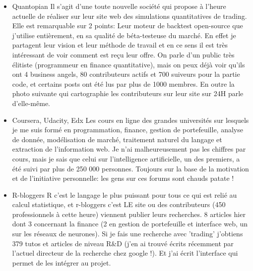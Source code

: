 \begin{itemize}

    \item Quantopian
  Il s'agit d'une toute nouvelle société qui propose à l'heure actuelle de
réaliser sur leur site web des simulations quantitatives de trading. Elle
est remarquable sur 2 points: Leur moteur de backtest open-source que
j'utilise entièrement,  en sa qualité de béta-testeuse du marché. En effet je partagent leur vision
et leur méthode de travail et en ce sens il est très intéressant de voir
comment est reçu leur offre. \newline
On parle d'un public très élitiste (programmeur en finance quantitative),
mais on peux déjà voir qu'ils ont 4 business angels, 80 contributeurs actifs et 700
suiveurs pour la partie code, et certains posts ont été lus par plus de 1000
membres. En outre la photo suivante qui cartographie les contributeurs sur
leur site sur 24H parle d'elle-même.\newline
\newline

  \item Coursera, Udacity, Edx
    Les cours en ligne des grandes universités sur lesquels je me suis
formé en programmation, finance, gestion de portefeuille, analyse de
donnée, modélisation de marché, traitement naturel du langage et
extraction de l'information web. Je n'ai malheureusement pas les
chiffres par cours, mais je sais que celui sur l'intelligence
artificielle, un des premiers, a été suivi par plus de 250 000
personnes. Toujours sur la base de la motivation et de l'initiative
personnelle: les gens sur ces forums sont chauds patate !\newline

  \item R-bloggers
    R c'est le langage le plus puissant pour tous ce qui est relié au
calcul statistique, et r-bloggers c'est LE site ou des contributeurs (450
professionnels à cette heure) viennent publier leurs recherches. 8 articles
hier dont 3 concernant la finance (2 en gestion de portefeuille et interface
web, un sur les réseaux de neurones). Si je fais une recherche avec 'trading'
j'obtiens 379 tutos et articles de niveau R&D (j'en ai trouvé écrits récemment par
l'actuel directeur de la recherche chez google !). Et j'ai écrit l'interface
qui permet de les intégrer au projet.\newline
\newline
\end{itemize}



